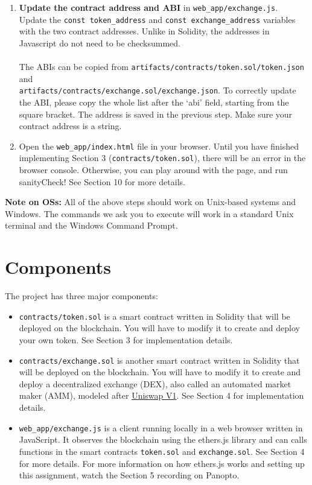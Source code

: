 \documentclass[11pt]{article}
\begin{document}
\begin{enumerate}
    \item \textbf {Update the contract address and ABI} in \verb|web_app/exchange.js|. \\ Update the \verb|const token_address| and \verb|const exchange_address| variables with the two contract addresses. Unlike in Solidity, the addresses in Javascript do not need to be checksummed.  \\ \\
    The ABIs can be copied from \verb|artifacts/contracts/token.sol/token.json| and \\ \verb|artifacts/contracts/exchange.sol/exchange.json|. To correctly update the ABI, please copy the whole list after the `abi' field, starting from the square bracket. The address is saved in the previous step. Make sure your contract address is a string.
    \item Open the \verb|web_app/index.html| file in your browser. Until you have finished implementing Section 3 (\verb|contracts/token.sol|), there will be an error in the browser console. Otherwise, you can play around with the page, and run sanityCheck! See Section 10 for more details.
\end{enumerate}

\textbf{Note on OSs:} All of the above steps should work on Unix-based systems and Windows. The commands we ask you to execute will work in a standard Unix terminal and the Windows Command Prompt.

\section{Components}

The project has three major components: 
\begin{itemize}
    \item \texttt{contracts/token.sol} is a smart contract written in Solidity that will be deployed on the blockchain. You will have to modify it to create and deploy your own token. See Section 3 for implementation details.
    \item \texttt{contracts/exchange.sol} is another smart contract written in Solidity that will be deployed on the blockchain. You will have to modify it to create and deploy a decentralized exchange (DEX), also called an automated market maker (AMM), modeled after \href{https://github.com/runtimeverification/verified-smart-contracts/blob/uniswap/uniswap/x-y-k.pdf}{Uniswap V1}. See Section 4 for implementation details.
    \item \texttt{web\_app/exchange.js} is a client running locally in a web browser written in JavaScript. It observes the blockchain using the ethers.js library and can calls functions in the smart contracts \texttt{token.sol} and \texttt{exchange.sol}. See Section 4 for more details. For more information on how ethers.js works and setting up this assignment, watch the Section 5 recording on Panopto.
\end{itemize}
\end{document}
